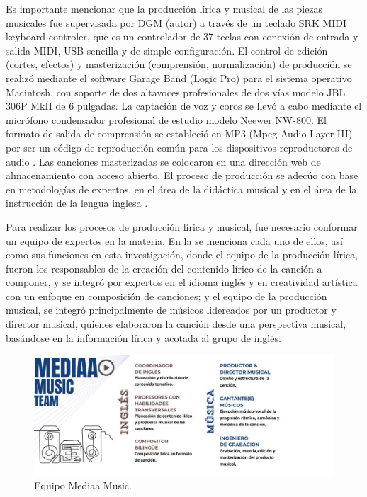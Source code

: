 \documentclass[spanish]{textolivre}
\begin{document}
Es importante mencionar que la producción lírica y musical de las piezas musicales fue supervisada por DGM (autor) a través de un teclado SRK MIDI keyboard controler, que es un controlador de 37 teclas con conexión de entrada y salida MIDI, USB sencilla y de simple configuración. El control de edición (cortes, efectos) y masterización (comprensión, normalización) de producción se realizó mediante el software Garage Band (Logic Pro) para el sistema operativo Macintosh, con soporte de dos altavoces profesionales de dos vías modelo JBL 306P MkII de 6 pulgadas. La captación de voz y coros se llevó a cabo mediante el micrófono condensador profesional de estudio modelo Neewer NW-800. El formato de salida de comprensión se estableció en MP3 (Mpeg Audio Layer III) por ser un código de reproducción común para los dispositivos reproductores de audio \cite{sinaga2019learning}. Las canciones masterizadas se colocaron en una dirección web de almacenamiento con acceso abierto. El proceso de producción se adecúo con base en metodologías de expertos, en el área de la didáctica musical y en el área de la instrucción de la lengua inglesa \cite{linares2018elaboracion}.

Para realizar los procesos de producción lírica y musical, fue necesario conformar un equipo de expertos en la materia. En la  se menciona cada uno de ellos, así como sus funciones en esta investigación, donde el equipo de la producción lírica, fueron los responsables de la creación del contenido lírico de la canción a componer, y se integró por expertos en el idioma inglés y en creatividad artística con un enfoque en composición de canciones; y el equipo de la producción musical, se integró principalmente de músicos lidereados por un productor y director musical, quienes elaboraron la canción desde una perspectiva musical, basándose en la información lírica y acotada al grupo de inglés.

\begin{figure}[h!]
\centering
\begin{minipage}{.8\textwidth}
 \includegraphics[width=\textwidth]{image3.jpeg}
 \caption{Equipo Mediaa Music.}
 \label{fig3}
\end{minipage}
\end{figure}
\end{document}
